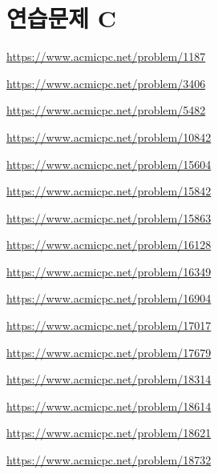\section{연습문제 C}
\begin{problem} \url{https://www.acmicpc.net/problem/1187} \end{problem}
\begin{problem} \url{https://www.acmicpc.net/problem/3406} \end{problem}
\begin{problem} \url{https://www.acmicpc.net/problem/5482} \end{problem}
\begin{problem} \url{https://www.acmicpc.net/problem/10842} \end{problem}
\begin{problem} \url{https://www.acmicpc.net/problem/15604} \end{problem}
\begin{problem} \url{https://www.acmicpc.net/problem/15842} \end{problem}
\begin{problem} \url{https://www.acmicpc.net/problem/15863} \end{problem}
\begin{problem} \url{https://www.acmicpc.net/problem/16128} \end{problem}
\begin{problem} \url{https://www.acmicpc.net/problem/16349} \end{problem}
\begin{problem} \url{https://www.acmicpc.net/problem/16904} \end{problem}
\begin{problem} \url{https://www.acmicpc.net/problem/17017} \end{problem}
\begin{problem} \url{https://www.acmicpc.net/problem/17679} \end{problem}
\begin{problem} \url{https://www.acmicpc.net/problem/18314} \end{problem}
\begin{problem} \url{https://www.acmicpc.net/problem/18614} \end{problem}
\begin{problem} \url{https://www.acmicpc.net/problem/18621} \end{problem}
\begin{problem} \url{https://www.acmicpc.net/problem/18732} \end{problem}
